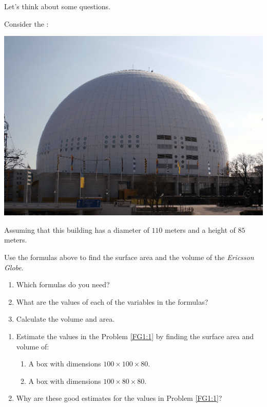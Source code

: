 \documentclass[handout,nooutcomes,noauthor,hints]{ximera}
\begin{document}
Let's think about some questions. 


\mynewpage




\begin{question} \label{FG1:1}
  Consider the :
   \begin{center}
    \includegraphics[width=.4\textwidth]{dome.png} %
   \end{center}
   Assuming that this building has a diameter of $110$ meters and a
   height of $85$ meters.
   
   Use the formulas above to find the surface area
     and the volume of the \textit{Ericsson Globe}.
   \begin{enumerate}
   
   \item Which formulas do you need? 
   
   \item What are the values of each of the variables in the formulas?
   
   \item Calculate the volume and area.
      \end{enumerate}
      \end{question}
\mynewpage




\begin{question}        
\begin{enumerate}
\item Estimate the values in the Problem \ref{FG1:1} by finding the surface area and
     volume of:

     \begin{enumerate}
     \item A box with dimensions $100\times 100 \times 80$.
     \item A box with dimensions $100\times 80 \times 80$.
  
     \end{enumerate}
\item Why are these good estimates for the values in Problem \ref{FG1:1}?
   \end{enumerate}
   \end{question}
\mynewpage
\end{document}
